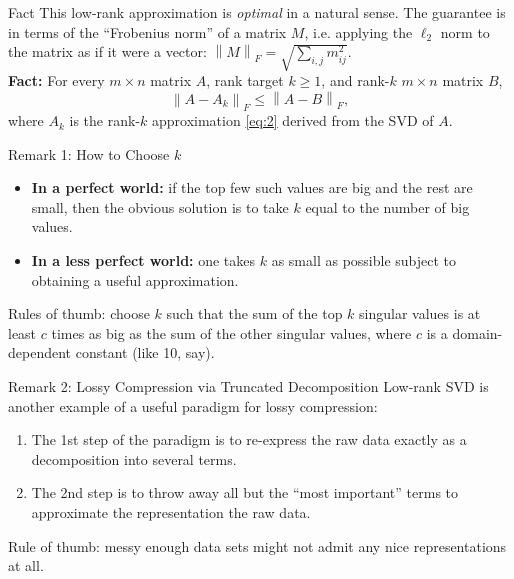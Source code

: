 \documentclass[aspectratio=169,xcolor=dvipsnames]{beamer}
\begin{document}

\begin{frame}{Fact}
    This low-rank approximation is \textit{optimal} in a natural sense. The guarantee is in terms of the \enquote{Frobenius norm} of a matrix $M$, i.e. applying the $\ell_2$ norm to the matrix as if it were a vector: $\left\| M \right\|_F = \sqrt{\sum_{i,j} m^2_{ij}}$.\\
    \vspace{1cm}
    \textbf{Fact:} For every $m\times n$ matrix $A$, rank target $k\geq 1$, and rank-$k$ $m\times n$ matrix $B$,
    \begin{equation}
        \label{eq:3}
        \left\| A - A_k\right\|_F \leq \left\| A- B\right\|_F ,
    \end{equation}
    where $A_k$ is the rank-$k$ approximation \eqref{eq:2} derived from the SVD of $A$.
\end{frame}


\begin{frame}{Remark 1: How to Choose $k$}
\begin{itemize}
    \item \textbf{In a perfect world:} if the top few such values are big and the rest are small, then the obvious solution is to take $k$ equal to the number of big values.
    \item \textbf{In a less perfect world:} one takes $k$ as small as possible subject to obtaining a useful approximation.
\end{itemize}
\vspace{1cm}
Rules of thumb: choose $k$ such that the sum of the top $k$ singular values is at least $c$ times as big as the sum of the other singular values, where $c$ is a domain-dependent constant (like
10, say).
\end{frame}


\begin{frame}{Remark 2: Lossy Compression via Truncated Decomposition}
Low-rank SVD is another example of a useful paradigm for lossy compression:
   \begin{enumerate}
       \item The 1st step of the paradigm is to re-express the raw data exactly as a decomposition into several terms.
       \item The 2nd step is to throw away all but the \enquote{most important} terms to approximate the representation the raw data.
   \end{enumerate}
   \vspace{1cm}
   Rule of thumb: messy enough data sets might not admit any nice representations at all.
\end{frame}
\end{document}
